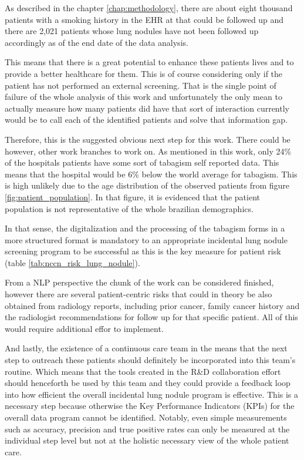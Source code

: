 \label{chap:conclusion}

As described in the chapter \ref{chap:methodology}, there are about eight thousand patients with a smoking history in the EHR at \nomeHslShort{} that could be followed up and there are 2,021 patients whose lung nodules have not been followed up accordingly as of the end date of the data analysis.

This means that there is a great potential to enhance these patients lives and to provide a better healthcare for them. This is of course considering only if the patient has not performed an external screening. That is the single point of failure of the whole analysis of this work and unfortunately the only mean to actually measure how many patients did have that sort of interaction currently would be to call each of the identified patients and solve that information gap.

Therefore, this is the suggested obvious next step for this work. There could be however, other work branches to work on. As mentioned in this work, only 24\% of the hospitals patients have some sort of tabagism self reported data. This means that the hospital would be 6\% below the world average for tabagism. This is high unlikely due to the age distribution of the observed patients from figure \ref{fig:patient_population}. In that figure, it is evidenced that the \nomeHslShort{} patient population is not representative of the whole brazilian demographics.%

In that sense, the digitalization and the processing of the tabagism forms in a more structured format is mandatory to an appropriate incidental lung nodule screening program to be successful as this is the key measure for patient risk (table \ref{tab:nccn_risk_lung_nodule}). 

From a NLP perspective the chunk of the work can be considered finished, however there are several patient-centric risks that could in theory be also obtained from radiology reports, including prior cancer, family cancer history and the radiologist recommendations for follow up for that specific patient. All of this would require additional effor to implement.

And lastly, the existence of a continuous care team in the \nomeHsl{} means that the next step to outreach these patients should definitely be incorporated into this team's routine. Which means that the tools created in the R\&D collaboration effort should henceforth be used by this team and they could provide a feedback loop into how efficient the overall incidental lung nodule program is effective. This is a necessary step because otherwise the Key Performance Indicators (KPIs) for the overall data program cannot be identified. Notably, even simple measurements such as accuracy, precision and true positive rates can only be measured at the individual step level but not at the holistic necessary view of the whole patient care.
